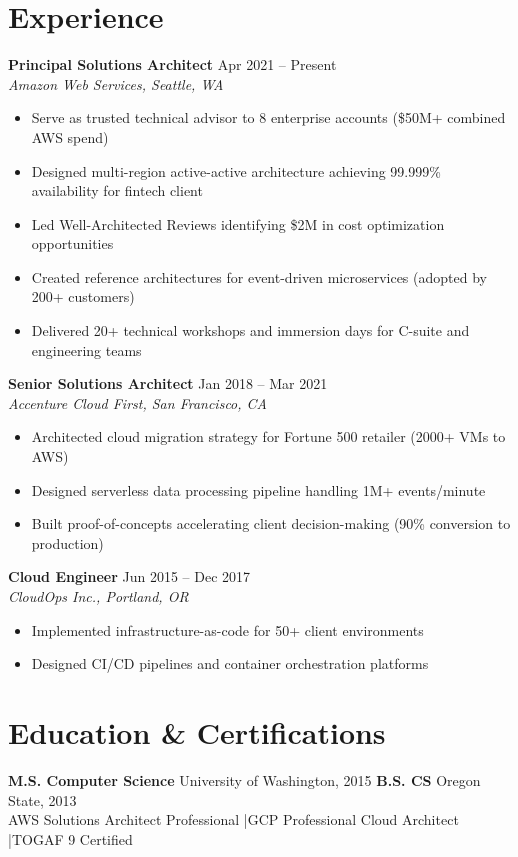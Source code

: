 \documentclass[11pt,a4paper]{article}
\begin{document}
\section{Experience}

\noindent\textbf{Principal Solutions Architect} \hfill \textcolor{accent}{Apr 2021 -- Present}\\
\textit{Amazon Web Services, Seattle, WA}
\begin{itemize}[leftmargin=1.2em,nosep,label={\color{accent}$\blacktriangleright$}]
\item Serve as trusted technical advisor to 8 enterprise accounts (\$50M+ combined AWS spend)
\item Designed multi-region active-active architecture achieving 99.999\% availability for fintech client
\item Led Well-Architected Reviews identifying \$2M in cost optimization opportunities
\item Created reference architectures for event-driven microservices (adopted by 200+ customers)
\item Delivered 20+ technical workshops and immersion days for C-suite and engineering teams
\end{itemize}
\vspace{0.5em}

\noindent\textbf{Senior Solutions Architect} \hfill \textcolor{accent}{Jan 2018 -- Mar 2021}\\
\textit{Accenture Cloud First, San Francisco, CA}
\begin{itemize}[leftmargin=1.2em,nosep,label={\color{accent}$\blacktriangleright$}]
\item Architected cloud migration strategy for Fortune 500 retailer (2000+ VMs to AWS)
\item Designed serverless data processing pipeline handling 1M+ events/minute
\item Built proof-of-concepts accelerating client decision-making (90\% conversion to production)
\end{itemize}
\vspace{0.5em}

\noindent\textbf{Cloud Engineer} \hfill \textcolor{accent}{Jun 2015 -- Dec 2017}\\
\textit{CloudOps Inc., Portland, OR}
\begin{itemize}[leftmargin=1.2em,nosep,label={\color{accent}$\blacktriangleright$}]
\item Implemented infrastructure-as-code for 50+ client environments
\item Designed CI/CD pipelines and container orchestration platforms
\end{itemize}

\section{Education \& Certifications}
\noindent\textbf{M.S. Computer Science} \hfill University of Washington, 2015 \quad\textbf{B.S. CS} \hfill Oregon State, 2013\\[0.3em]
AWS Solutions Architect Professional \quad\textcolor{accent}{|}\quad GCP Professional Cloud Architect \quad\textcolor{accent}{|}\quad TOGAF 9 Certified
\end{document}
